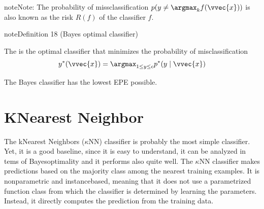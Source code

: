 \documentclass[letterpaper,10pt,english]{jupyterBook}
\begin{document}
\begin{sphinxadmonition}{note}{Note:}
\sphinxAtStartPar
The probability of miss\sphinxhyphen{}classification \( p( y \neq \argmax_k f(\vvec{x})) \) is also known as the risk \( R(f) \) of the classifier \( f \).
\end{sphinxadmonition}
\label{classification_problem:bayes_optimal_classifier}
\begin{sphinxadmonition}{note}{Definition 18 (Bayes optimal classifier)}



\sphinxAtStartPar
The  is the optimal classifier that minimizes the probability of misclassification
\begin{equation}\label{equation:classification_problem:final_estimator}
\begin{split}y^\ast(\vvec{x}) = \argmax_{1\leq y\leq c} p^\ast (y\mid \vvec{x})\end{split}
\end{equation}\end{sphinxadmonition}

\sphinxAtStartPar
The Bayes classifier has the lowest EPE possible.

\sphinxstepscope


\section{K\sphinxhyphen{}Nearest Neighbor}
\label{\detokenize{classification_knn:k-nearest-neighbor}}\label{\detokenize{classification_knn::doc}}
\sphinxAtStartPar
The k\sphinxhyphen{}Nearest Neighbors (\(\kappa\)NN) classifier is probably the most simple classifier. Yet, it is a good baseline, since it is easy to understand, it can be analyzed in tems of Bayes\sphinxhyphen{}optimality and it performs also quite well. The \(\kappa\)NN classifier makes predictions based on the majority class among the nearest training examples. It is non\sphinxhyphen{}parametric and instance\sphinxhyphen{}based, meaning that it does not use a parametrized function class from which the classifier is determined by learning the parameters. Instead, it directly computes the prediction from the training data.
\end{document}
